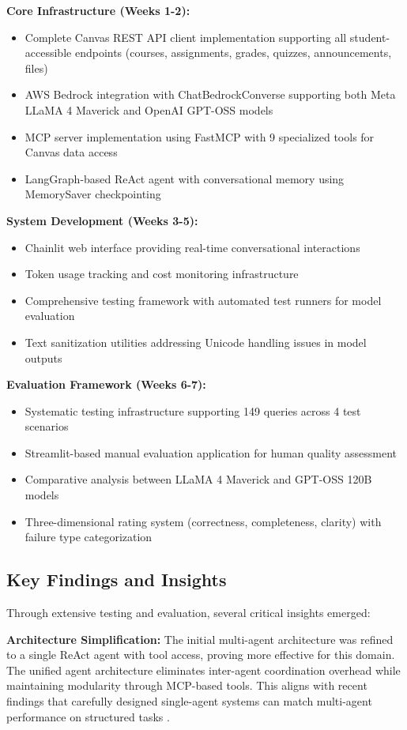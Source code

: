 \documentclass{article}
\begin{document}
\textbf{Core Infrastructure (Weeks 1-2):}
\begin{itemize}
    \item Complete Canvas REST API client implementation supporting all student-accessible endpoints (courses, assignments, grades, quizzes, announcements, files)
    \item AWS Bedrock integration with ChatBedrockConverse supporting both Meta LLaMA 4 Maverick and OpenAI GPT-OSS models
    \item MCP server implementation using FastMCP with 9 specialized tools for Canvas data access
    \item LangGraph-based ReAct agent with conversational memory using MemorySaver checkpointing
\end{itemize}

\textbf{System Development (Weeks 3-5):}
\begin{itemize}
    \item Chainlit web interface providing real-time conversational interactions
    \item Token usage tracking and cost monitoring infrastructure
    \item Comprehensive testing framework with automated test runners for model evaluation
    \item Text sanitization utilities addressing Unicode handling issues in model outputs
\end{itemize}

\textbf{Evaluation Framework (Weeks 6-7):}
\begin{itemize}
    \item Systematic testing infrastructure supporting 149 queries across 4 test scenarios
    \item Streamlit-based manual evaluation application for human quality assessment
    \item Comparative analysis between LLaMA 4 Maverick and GPT-OSS 120B models
    \item Three-dimensional rating system (correctness, completeness, clarity) with failure type categorization
\end{itemize}

\subsection{Key Findings and Insights}

Through extensive testing and evaluation, several critical insights emerged:

\textbf{Architecture Simplification:} The initial multi-agent architecture was refined to a single ReAct agent with tool access, proving more effective for this domain. The unified agent architecture eliminates inter-agent coordination overhead while maintaining modularity through MCP-based tools. This aligns with recent findings that carefully designed single-agent systems can match multi-agent performance on structured tasks \cite{chen2024llmma}.
\end{document}
